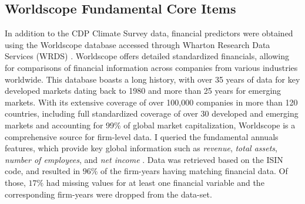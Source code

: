 


\subsection{Worldscope Fundamental Core Items}
In addition to the CDP Climate Survey data, financial predictors were obtained using the Worldscope database \cite{Worldscope_2} accessed through Wharton Research Data Services (WRDS) \cite{WRDS}. Worldscope offers detailed standardized financials, allowing for comparisons of financial information across companies from various industries worldwide. This database boasts a long history, with over 35 years of data for key developed markets dating back to 1980 and more than 25 years for emerging markets. With its extensive coverage of over 100,000 companies in more than 120 countries, including full standardized coverage of over 30 developed and emerging markets and accounting for 99\% of global market capitalization, Worldscope is a comprehensive source for firm-level data. I queried the fundamental annuals features, which provide key global information such as \textit{revenue}, \textit{total assets}, \textit{number of employees}, and \textit{net income} \cite{Worldscope_2}. Data was retrieved based on the ISIN code, and resulted in $96\%$ of the firm-years having matching financial data. Of those, $17\%$ had missing values for at least one financial variable and the corresponding firm-years were dropped from the data-set. 

